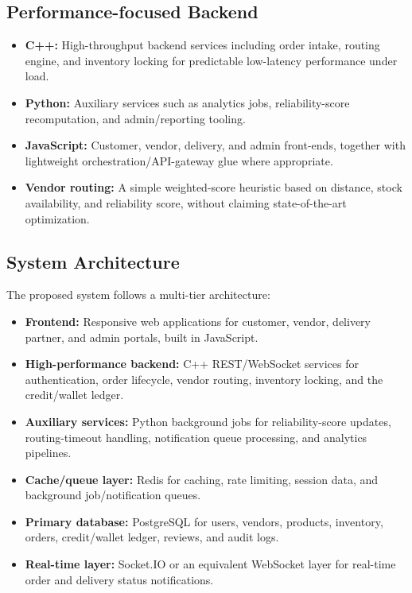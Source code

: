 \documentclass[11pt,a4paper]{article}
\begin{document}
\subsection{Performance-focused Backend}

\begin{itemize}[leftmargin=1.5em]
    \item \textbf{C++:} High-throughput backend services including order intake, routing engine,
    and inventory locking for predictable low-latency performance under load.
    \item \textbf{Python:} Auxiliary services such as analytics jobs, reliability-score
    recomputation, and admin/reporting tooling.
    \item \textbf{JavaScript:} Customer, vendor, delivery, and admin front-ends, together with
    lightweight orchestration/API-gateway glue where appropriate.
    \item \textbf{Vendor routing:} A simple weighted-score heuristic based on distance, stock
    availability, and reliability score, without claiming state-of-the-art optimization.
\end{itemize}

\subsection{System Architecture}

The proposed system follows a multi-tier architecture:

\begin{itemize}[leftmargin=1.5em]
    \item \textbf{Frontend:} Responsive web applications for customer, vendor, delivery partner,
    and admin portals, built in JavaScript.
    \item \textbf{High-performance backend:} C++ REST/WebSocket services for authentication,
    order lifecycle, vendor routing, inventory locking, and the credit/wallet ledger.
    \item \textbf{Auxiliary services:} Python background jobs for reliability-score updates,
    routing-timeout handling, notification queue processing, and analytics pipelines.
    \item \textbf{Cache/queue layer:} Redis for caching, rate limiting, session data, and
    background job/notification queues.
    \item \textbf{Primary database:} PostgreSQL for users, vendors, products, inventory, orders,
    credit/wallet ledger, reviews, and audit logs.
    \item \textbf{Real-time layer:} Socket.IO or an equivalent WebSocket layer for real-time
    order and delivery status notifications.
\end{itemize}
\end{document}
